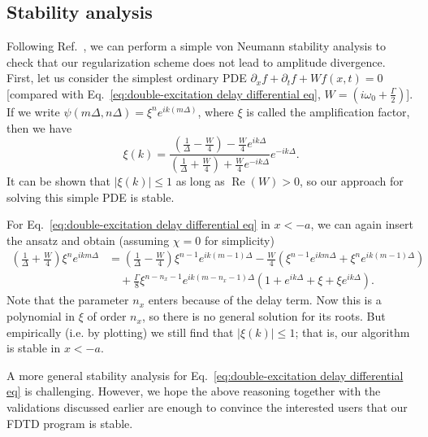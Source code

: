 \documentclass[12pt,letter,onecolumn,notitlepage]{article}
\DeclareMathOperator{\re}{Re}
\begin{document}
\begin{appendices}
\section{Stability analysis}
\label{appen: stability}
Following Ref.~\cite{NumericalRecipes}, we can perform a simple von Neumann stability analysis to check that our regularization scheme does not lead to amplitude divergence. First, let us consider the simplest ordinary PDE $\partial_x f+\partial_t f+W f(x,t)=0$ [compared with Eq.~\eqref{eq:double-excitation delay differential eq}, $W=\left(i\omega_0+\frac{\Gamma}{2}\right)$]. If we write $\psi(m\Delta, n\Delta)=\xi^n e^{ik(m\Delta)}$, where $\xi$ is called the amplification factor, then we have 
\begin{equation}
	\xi(k) = \frac{\left(\frac{1}{\Delta}-\frac{W}{4}\right)-\frac{W}{4}e^{ik\Delta}}{\left(\frac{1}{\Delta}+\frac{W}{4}\right)+\frac{W}{4}e^{-ik\Delta}}e^{-ik\Delta}.
\end{equation}
It can be shown that $|\xi(k)|\leq 1$ as long as $\re(W)>0$, so our approach for solving this simple PDE is stable.

For Eq.~\eqref{eq:double-excitation delay differential eq} in $x<-a$, we can again insert the ansatz and obtain
(assuming $\chi=0$ for simplicity)
\begin{align}
	\left(\frac{1}{\Delta}+\frac{W}{4}\right)\xi^n e^{ikm\Delta}
	&=	\left(\frac{1}{\Delta}-\frac{W}{4}\right)\xi^{n-1} e^{ik(m-1)\Delta}
	-\frac{W}{4}\left(\xi^{n-1}e^{ikm\Delta}+\xi^{n}e^{ik(m-1)\Delta}\right)\nonumber\\
	&\quad+\frac{\Gamma}{8}\xi^{n-n_x-1}e^{ik(m-n_x-1)\Delta}\left(1+e^{ik\Delta}+\xi+\xi e^{ik\Delta}\right).
\end{align}
Note that the parameter $n_x$ enters because of the delay term. Now this is a polynomial in $\xi$ of order $n_x$, so there is no general solution for its roots. But empirically (i.e. by plotting) we still find that $|\xi(k)|\leq 1$; that is, our algorithm is stable in $x<-a$.

A more general stability analysis for Eq.~\eqref{eq:double-excitation delay differential eq} is challenging. However, we hope the above reasoning together with the validations discussed earlier are enough to convince the interested users that our FDTD program is stable. 




\end{appendices}
\end{document}
